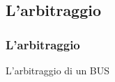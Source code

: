

\subsection[L'arbitraggio]{L'arbitraggio}
\begin{frame}
	\frametitle{L'arbitraggio}
	  
	\begin{block}{L'arbitraggio di un BUS}
		
		
	\end{block}

\end{frame}
